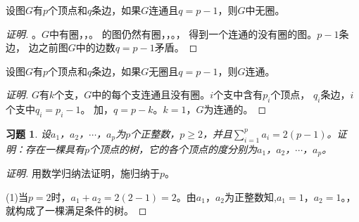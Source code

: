 \documentclass{beamer}
\newtheorem{Exercise}{习题}
\begin{document}
\begin{CJK*}{UTF8}{gbsn}
\begin{frame}
\end{frame}
\begin{frame}
\begin{Thm}
  设图$G$有$p$个顶点和$q$条边，如果$G$连通且$q=p-1$，则$G$中无圈。
\end{Thm}
\pause\begin{proof}[证明]
。$G$中有圈，，。
的图仍然有圈，，。，
得到一个连通的没有圈的图。$p-1$条边，
边之前图$G$中的边数$q=p-1$矛盾。 
\end{proof}
  \end{frame}
\begin{frame}
\begin{Thm}
  设图$G$有$p$个顶点和$q$条边，如果$G$无圈且$q=p-1$，则$G$连通。
\end{Thm}
\pause\begin{proof}[证明]
  $G$有$k$个支，$G$中的每个支连通且没有圈。$i$个支中含有$p_i$个顶点，
\pause$q_i$条边，$i$个支中$q_i=p_i-1$。
加，$q = p-k$。$k=1$，$G$为连通的。
\end{proof}
\end{frame}
\begin{frame}
  \begin{Exercise}\small\justifying\let\raggedright\justifying
  设$a_1$，$a_2$，$\cdots$，$a_p$为$p$个正整数，$p\geq 2$，并且$\sum_{i=1}^pa_i=2(p-1)$。证明：存在一棵具有$p$个顶点的树，它的各个顶点的度分别为$a_1$，$a_2$，$\cdots$，$a_p$。
\end{Exercise}\pause
\begin{proof}[证明]\small\justifying\let\raggedright\justifying
  用数学归纳法证明，施归纳于$p$。\pause

  (1)当$p=2$时，$a_1+a_2=2(2-1)=2$。\pause 由$a_1$，$a_2$为正整数知,$a_1=1$，$a_2=1$。，就构成了一棵满足条件的树。\pause


\end{proof}
\end{frame}
\end{CJK*}
\end{document}
